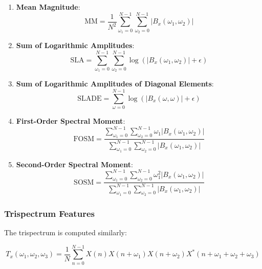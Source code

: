 \begin{enumerate}
    \item \textbf{Mean Magnitude}:
    \begin{equation}
    \text{MM} = \frac{1}{N^2} \sum_{\omega_1=0}^{N-1} \sum_{\omega_2=0}^{N-1} |B_x(\omega_1, \omega_2)|
    \end{equation}
    
    \item \textbf{Sum of Logarithmic Amplitudes}:
    \begin{equation}
    \text{SLA} = \sum_{\omega_1=0}^{N-1} \sum_{\omega_2=0}^{N-1} \log(|B_x(\omega_1, \omega_2)| + \epsilon)
    \end{equation}
    
    \item \textbf{Sum of Logarithmic Amplitudes of Diagonal Elements}:
    \begin{equation}
    \text{SLADE} = \sum_{\omega=0}^{N-1} \log(|B_x(\omega, \omega)| + \epsilon)
    \end{equation}
    
    \item \textbf{First-Order Spectral Moment}:
    \begin{equation}
    \text{FOSM} = \frac{\sum_{\omega_1=0}^{N-1} \sum_{\omega_2=0}^{N-1} \omega_1 |B_x(\omega_1, \omega_2)|}{\sum_{\omega_1=0}^{N-1} \sum_{\omega_2=0}^{N-1} |B_x(\omega_1, \omega_2)|}
    \end{equation}
    
    \item \textbf{Second-Order Spectral Moment}:
    \begin{equation}
    \text{SOSM} = \frac{\sum_{\omega_1=0}^{N-1} \sum_{\omega_2=0}^{N-1} \omega_1^2 |B_x(\omega_1, \omega_2)|}{\sum_{\omega_1=0}^{N-1} \sum_{\omega_2=0}^{N-1} |B_x(\omega_1, \omega_2)|}
    \end{equation}
\end{enumerate}

\subsubsection{Trispectrum Features}

The trispectrum is computed similarly:

\begin{equation}
T_x(\omega_1, \omega_2, \omega_3) = \frac{1}{N} \sum_{n=0}^{N-1} X(n)X(n+\omega_1)X(n+\omega_2)X^*(n+\omega_1+\omega_2+\omega_3)
\end{equation}

